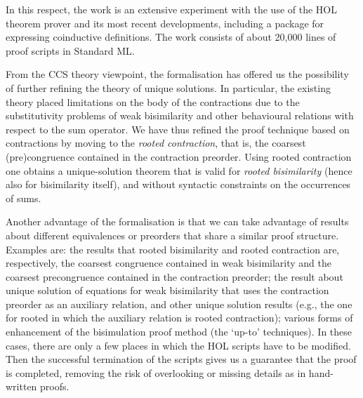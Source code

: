   
In this respect,  the work is an extensive experiment with the use of the HOL theorem prover and its
most recent developments, including a package  for expressing coinductive definitions.
The
work consists of about 20,000 lines of proof scripts in Standard ML.



From the CCS theory viewpoint, the formalisation has offered us the possibility of 
further refining the theory of unique solutions. 
In particular, the existing theory  placed limitations on the body of the contractions due to the
substitutivity problems of weak bisimilarity and other behavioural relations with respect
to the sum operator.  
We have thus refined the proof  technique based on contractions by moving to the 
\emph{rooted contraction}, that is, the coarsest (pre)congruence contained in the contraction
preorder.  Using rooted contraction one obtains a unique-solution theorem that is valid for
\emph{rooted bisimilarity} (hence also for bisimilarity itself), and without syntactic
constraints on the occurrences of sums.   


Another advantage of the formalisation is 
that we can take advantage of results about different 
equivalences or preorders that share a similar  proof structure. 
Examples are: the results that rooted bisimilarity and rooted contraction are,
respectively, the coarsest congruence contained in weak bisimilarity 
and the coarsest precongruence contained in the contraction  preorder; 
the result about unique solution of equations for weak bisimilarity that uses the
contraction preorder as an auxiliary relation, and other unique solution results (e.g., 
the one for rooted in which
the auxiliary relation is rooted contraction); various forms of enhancement of the bisimulation
proof method (the `up-to' techniques).  
In these cases, there are only a few places in which the HOL scripts have to be modified.
Then the successful termination of the scripts  gives us a guarantee that the proof is
completed,  removing the risk 
of overlooking or missing details as in hand-written proofs. 



